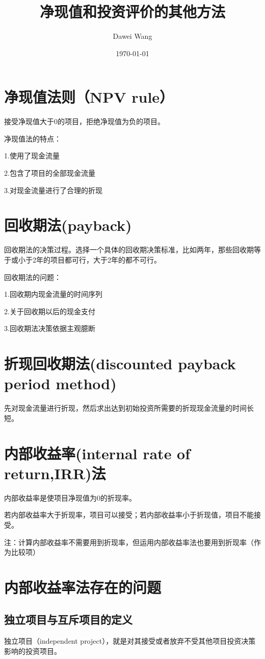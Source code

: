 \documentclass{article}
\title{净现值和投资评价的其他方法}
\author{Dawei Wang}
\date{\today}
\begin{document}
	\maketitle
\section{净现值法则（NPV rule）}

接受净现值大于0的项目，拒绝净现值为负的项目。

\hspace*{\fill}

净现值法的特点：

1.使用了现金流量

2.包含了项目的全部现金流量

3.对现金流量进行了合理的折现

\section{回收期法(payback)}
回收期法的决策过程。选择一个具体的回收期决策标准，比如两年，那些回收期等于或小于2年的项目都可行，大于2年的都不可行。

回收期法的问题：

1.回收期内现金流量的时间序列

2.关于回收期以后的现金支付

3.回收期法决策依据主观臆断

\section{折现回收期法(discounted payback period method)}
先对现金流量进行折现，然后求出达到初始投资所需要的折现现金流量的时间长短。

\section{内部收益率(internal rate of return,IRR)法}
内部收益率是使项目净现值为0的折现率。

若内部收益率大于折现率，项目可以接受；若内部收益率小于折现值，项目不能接受。

注：计算内部收益率不需要用到折现率，但运用内部收益率法也要用到折现率（作为比较项）

\section{内部收益率法存在的问题}
\subsection{独立项目与互斥项目的定义}
独立项目（independent project），就是对其接受或者放弃不受其他项目投资决策影响的投资项目。
\end{document}
